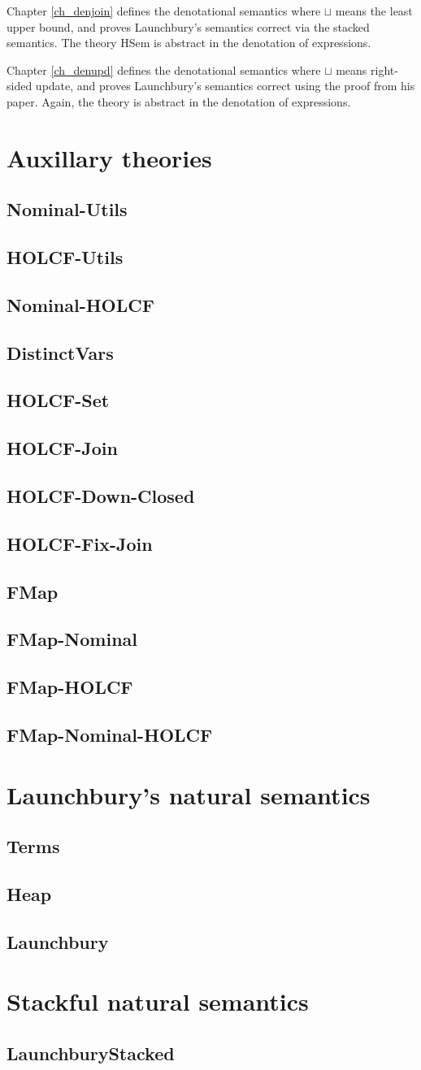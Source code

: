 \documentclass[11pt,a4paper,parskip=half]{scrbook}
\begin{document}
Chapter \ref{ch_denjoin} defines the denotational semantics where $\sqcup$ means the least upper bound, and proves Launchbury's semantics correct via the stacked semantics. The theory HSem is abstract in the denotation of expressions.

Chapter \ref{ch_denupd} defines the denotational semantics where $\sqcup$ means right-sided update, and proves Launchbury's semantics correct using the proof from his paper. Again, the theory  is abstract in the denotation of expressions.


\newcommand{\theory}[1]{\section{#1}\label{sec_#1}}

\chapter{Auxillary theories}
\label{ch_aux}

\theory{Nominal-Utils}

\theory{HOLCF-Utils}

\theory{Nominal-HOLCF}

\theory{DistinctVars}

\theory{HOLCF-Set}

\theory{HOLCF-Join}

\theory{HOLCF-Down-Closed}

\theory{HOLCF-Fix-Join}

\theory{FMap}

\theory{FMap-Nominal}

\theory{FMap-HOLCF}

\theory{FMap-Nominal-HOLCF}


\chapter{Launchbury's natural semantics}
\label{ch_natsem}

\theory{Terms}
\theory{Heap}

\theory{Launchbury}

\chapter{Stackful natural semantics}
\label{ch_natsemstack}

\theory{LaunchburyStacked}
\end{document}
